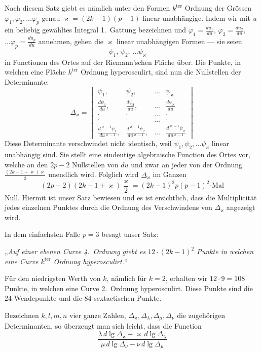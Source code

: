 \documentclass{article}
\begin{document}
Nach diesem Satz giebt es nämlich unter den Formen $k^{\text{ter}}$ Ordnung der Grössen $\varphi_1, \varphi_2, \dots \varphi_p$ genau $\varkappa = (2k-1)(p-1)$ linear unabhängige. Indem wir mit $u$ ein beliebig gewähltes Integral 1.~Gattung bezeichnen und $\varphi_1 = \frac{du_1}{du}$, $\varphi_2 = \frac{du_2}{du}$, $\dots \varphi_p = \frac{du_p}{du}$ annehmen, gehen die $\varkappa$ linear unabhängigen Formen --- sie seien
\[
\psi_1,\, \psi_2,\, \dots \psi_\varkappa \text{ ---}
\]
in Functionen des Ortes auf der Riemann'schen Fläche über. Die Punkte, in welchen eine Fläche $k^{\text{ter}}$ Ordnung hyperosculirt, sind nun die Nullstellen der Determinante:
\[
\Delta_\varkappa =
\begin{vmatrix}
\psi_1, & \psi_2, & \dots & \psi_\varkappa \\
\frac{d\psi_1}{du}, & \frac{d\psi_2}{du}, & \dots & \frac{d\psi_\varkappa}{du} \\
\cdot & \cdot & \dots & \cdot \\
\cdot & \cdot & \dots & \cdot \\
\frac{d^{\varkappa-1}\psi_1}{du^{\varkappa-1}}, & \frac{d^{\varkappa-1}\psi_2}{du^{\varkappa-1}}, & \dots & \frac{d^{\varkappa-1}\psi_\varkappa}{du^{\varkappa-1}}
\end{vmatrix}
\]
Diese Determinante verschwindet nicht identisch, weil $\psi_1, \psi_2, \dots \psi_\varkappa$ linear unabhängig sind. Sie stellt eine eindeutige algebraische Function des Ortes vor, welche an den $2p - 2$ Nullstellen von $du$ und zwar an jeder von der Ordnung $\frac{(2k-1+\varkappa)\varkappa}{2}$ unendlich wird. Folglich wird $\Delta_\varkappa$ im Ganzen
\[
(2p-2)(2k-1+\varkappa)\frac{\varkappa}{2} = (2k-1)^2 p(p-1)^2\text{-Mal}
\]
Null. Hiermit ist unser Satz bewiesen und es ist ersichtlich, dass die Multiplicität jedes einzelnen Punktes durch die Ordnung des Verschwindens von $\Delta_\varkappa$ angezeigt wird.

In dem einfachsten Falle $p = 3$ besagt unser Satz:

„\emph{Auf einer ebenen Curve 4.~Ordnung giebt es $12 \cdot (2k-1)^2$ Punkte in welchen eine Curve $k^{\text{ter}}$ Ordnung hyperosculirt.}“

Für den niedrigsten Werth von $k$, nämlich für $k = 2$, erhalten wir $12 \cdot 9 = 108$ Punkte, in welchen eine Curve 2.~Ordnung hyperosculirt. Diese Punkte sind die $24$ Wendepunkte und die $84$ sextactischen Punkte.

Bezeichnen $k, l, m, n$ vier ganze Zahlen, $\Delta_\varkappa, \Delta_\lambda, \Delta_\mu, \Delta_\nu$ die zugehörigen Determinanten, so überzeugt man sich leicht, dass die Function
\[
\frac{\lambda \, d\lg\Delta_\varkappa - \varkappa \, d\lg\Delta_\lambda}{\mu \, d\lg\Delta_\nu - \nu \, d\lg\Delta_\mu}
\]
\end{document}
